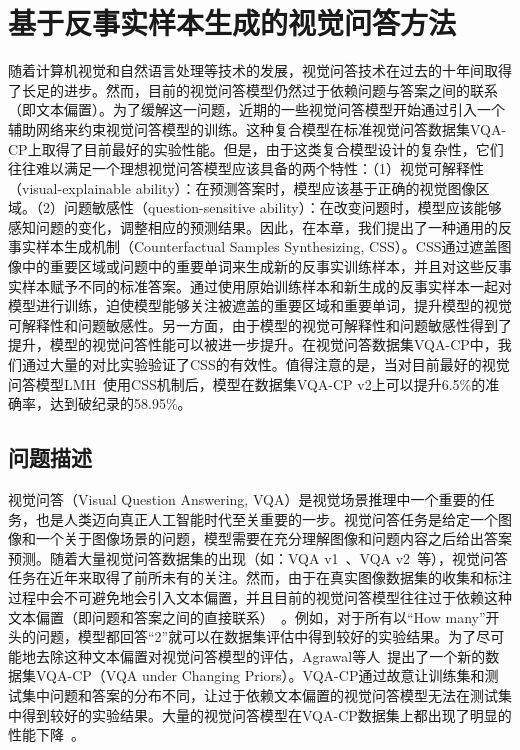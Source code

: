 \chapter{基于反事实样本生成的视觉问答方法}

随着计算机视觉和自然语言处理等技术的发展，视觉问答技术在过去的十年间取得了长足的进步。然而，目前的视觉问答模型仍然过于依赖问题与答案之间的联系（即文本偏置）。为了缓解这一问题，近期的一些视觉问答模型开始通过引入一个辅助网络来约束视觉问答模型的训练。这种复合模型在标准视觉问答数据集VQA-CP上取得了目前最好的实验性能。但是，由于这类复合模型设计的复杂性，它们往往难以满足一个理想视觉问答模型应该具备的两个特性：（1）视觉可解释性（visual-explainable ability）：在预测答案时，模型应该基于正确的视觉图像区域。（2）问题敏感性（question-sensitive ability）：在改变问题时，模型应该能够感知问题的变化，调整相应的预测结果。因此，在本章，我们提出了一种通用的反事实样本生成机制（Counterfactual Samples Synthesizing, CSS）。CSS通过遮盖图像中的重要区域或问题中的重要单词来生成新的反事实训练样本，并且对这些反事实样本赋予不同的标准答案。通过使用原始训练样本和新生成的反事实样本一起对模型进行训练，迫使模型能够关注被遮盖的重要区域和重要单词，提升模型的视觉可解释性和问题敏感性。另一方面，由于模型的视觉可解释性和问题敏感性得到了提升，模型的视觉问答性能可以被进一步提升。在视觉问答数据集VQA-CP中，我们通过大量的对比实验验证了CSS的有效性。值得注意的是，当对目前最好的视觉问答模型LMH~\cite{clark2019don}使用CSS机制后，模型在数据集VQA-CP v2上可以提升6.5\%的准确率，达到破纪录的58.95\%。

\section{问题描述} \label{ch7:sec:introduction}
视觉问答（Visual Question Answering, VQA）是视觉场景推理中一个重要的任务，也是人类迈向真正人工智能时代至关重要的一步。视觉问答任务是给定一个图像和一个关于图像场景的问题，模型需要在充分理解图像和问题内容之后给出答案预测。随着大量视觉问答数据集的出现（如：VQA v1~\cite{antol2015vqa}、VQA v2~\cite{goyal2017making}等），视觉问答任务在近年来取得了前所未有的关注。然而，由于在真实图像数据集的收集和标注过程中会不可避免地会引入文本偏置，并且目前的视觉问答模型往往过于依赖这种文本偏置（即问题和答案之间的直接联系）~\cite{agrawal2016analyzing,zhang2016yin,johnson2017clevr,goyal2017making}。例如，对于所有以“How many”开头的问题，模型都回答“2”就可以在数据集评估中得到较好的实验结果。为了尽可能地去除这种文本偏置对视觉问答模型的评估，Agrawal等人~\cite{agrawal2018don}提出了一个新的数据集VQA-CP（VQA under Changing Priors）。VQA-CP通过故意让训练集和测试集中问题和答案的分布不同，让过于依赖文本偏置的视觉问答模型无法在测试集中得到较好的实验结果。大量的视觉问答模型在VQA-CP数据集上都出现了明显的性能下降~\cite{andreas2016neural,fukui2016multimodal,yang2016stacked,anderson2018bottom}。

